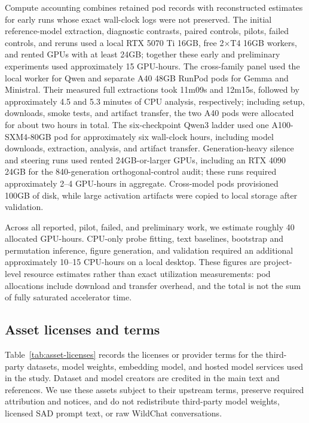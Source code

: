 \documentclass{article}
\begin{document}
Compute accounting combines retained pod records with reconstructed estimates
for early runs whose exact wall-clock logs were not preserved. The initial
reference-model extraction, diagnostic contrasts, paired controls, pilots,
failed controls, and reruns used a local RTX 5070 Ti 16GB, free 2$\times$T4
16GB workers, and rented GPUs with at least 24GB; together these early and
preliminary experiments used approximately 15 GPU-hours. The cross-family
panel used the local worker for Qwen and separate A40 48GB RunPod pods for Gemma and
Ministral. Their measured full extractions took 11m09s and 12m15s, followed by
approximately 4.5 and 5.3 minutes of CPU analysis, respectively; including
setup, downloads, smoke tests, and artifact transfer, the two A40 pods were
allocated for about two hours in total. The six-checkpoint Qwen3 ladder used one
A100-SXM4-80GB pod for approximately six wall-clock hours, including model
downloads, extraction, analysis, and artifact transfer. Generation-heavy
silence and steering runs used rented 24GB-or-larger GPUs, including an RTX
4090 24GB for the 840-generation orthogonal-control audit; these runs required
approximately 2--4 GPU-hours in aggregate. Cross-model pods provisioned 100GB
of disk, while large activation artifacts were copied to local storage after
validation.

Across all reported, pilot, failed, and preliminary work, we estimate roughly
40 allocated GPU-hours. CPU-only probe fitting, text baselines, bootstrap and
permutation inference, figure generation, and validation required an additional
approximately 10--15 CPU-hours on a local desktop. These figures are
project-level resource estimates rather than exact utilization measurements:
pod allocations include download and transfer overhead, and the total is not
the sum of fully saturated accelerator time.

\subsection{Asset licenses and terms}

Table~\ref{tab:asset-licenses} records the licenses or provider terms for the
third-party datasets, model weights, embedding model, and hosted model services
used in the study. Dataset and model creators are credited in the main text and
references. We use these assets subject to their upstream terms, preserve
required attribution and notices, and do not redistribute third-party model
weights, licensed SAD prompt text, or raw WildChat conversations.
\end{document}
